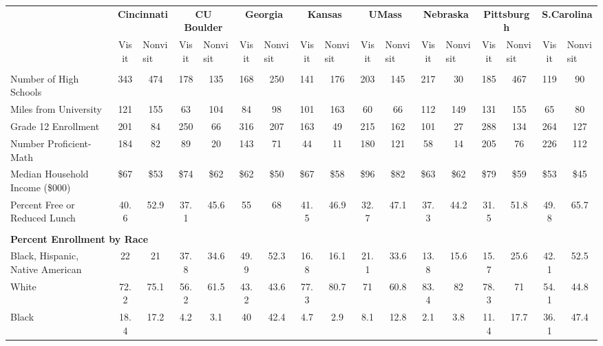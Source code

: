 \begin{tabular*}{\linewidth}{@{\extracolsep{\fill} } lcccccccccccccccc}%
&\multicolumn{2}{c}{\bfseries Cincinnati}&\multicolumn{2}{c}{\bfseries CU Boulder}&\multicolumn{2}{c}{\bfseries Georgia}&\multicolumn{2}{c}{\bfseries Kansas}&\multicolumn{2}{c}{\bfseries UMass}&\multicolumn{2}{c}{\bfseries Nebraska}&\multicolumn{2}{c}{\bfseries Pittsburgh}&\multicolumn{2}{c}{\bfseries S.Carolina}\\%
&Visit&\multicolumn{1}{l}{Nonvisit}&Visit&\multicolumn{1}{l}{Nonvisit}&Visit&\multicolumn{1}{l}{Nonvisit}&Visit&\multicolumn{1}{l}{Nonvisit}&Visit&\multicolumn{1}{l}{Nonvisit}&Visit&\multicolumn{1}{l}{Nonvisit}&Visit&\multicolumn{1}{l}{Nonvisit}&Visit&\multicolumn{1}{l}{Nonvisit}\\%
\hline%
&&&&&&&&&&&&&&&&\\%
\hspace{0cm}Number of High Schools&343&474&178&135&168&250&141&176&203&145&217&30&185&467&119&90\\%
\hspace{0cm}Miles from University&121&155&63&104&84&98&101&163&60&66&112&149&131&155&65&80\\%
\hspace{0cm}Grade 12 Enrollment&201&84&250&66&316&207&163&49&215&162&101&27&288&134&264&127\\%
\hspace{0cm}Number Proficient{-}Math&184&82&89&20&143&71&44&11&180&121&58&14&205&76&226&112\\%
\hspace{0cm}Median Household Income (\$000)&\$67&\$53&\$74&\$62&\$62&\$50&\$67&\$58&\$96&\$82&\$63&\$62&\$79&\$59&\$53&\$45\\%
\hspace{0cm}Percent Free or Reduced Lunch&40.6&52.9&37.1&45.6&55&68&41.5&46.9&32.7&47.1&37.3&44.2&31.5&51.8&49.8&65.7\\%
&&&&&&&&&&&&&&&&\\%
\multicolumn{17}{l}{\bfseries Percent Enrollment by Race}\\%
\hspace{0.2cm}Black, Hispanic, Native American&22&21&37.8&34.6&49.9&52.3&16.8&16.1&21.1&33.6&13.8&15.6&15.7&25.6&42.1&52.5\\%
\hspace{0.2cm}White&72.2&75.1&56.2&61.5&43.2&43.6&77.3&80.7&71&60.8&83.4&82&78.3&71&54.1&44.8\\%
\hspace{0.2cm}Black&18.4&17.2&4.2&3.1&40&42.4&4.7&2.9&8.1&12.8&2.1&3.8&11.4&17.7&36.1&47.4\\%

\end{tabular*}
